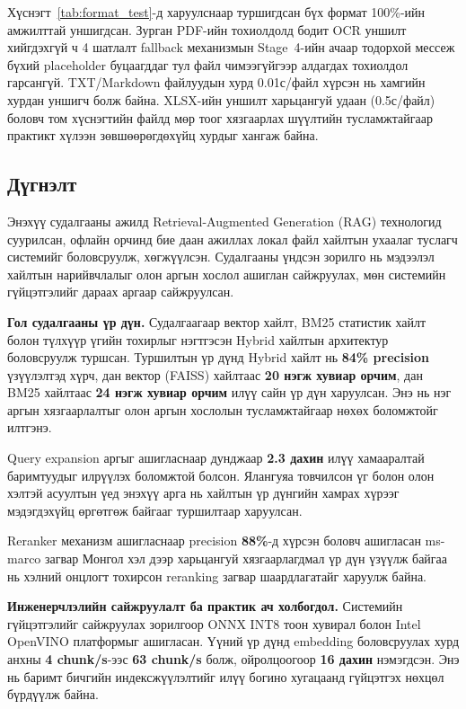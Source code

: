 \documentclass[11pt,a4paper]{article}
\begin{document}
Хүснэгт~\ref{tab:format_test}-д харуулснаар туршигдсан бүх формат 100\%-ийн амжилттай уншигдсан. Зурган PDF-ийн тохиолдолд бодит OCR уншилт хийгдэхгүй ч 4 шатлалт fallback механизмын Stage~4-ийн ачаар тодорхой мессеж бүхий placeholder буцаагддаг тул файл чимээгүйгээр алдагдах тохиолдол гарсангүй. TXT/Markdown файлуудын хурд 0.01с/файл хүрсэн нь хамгийн хурдан уншигч болж байна. XLSX-ийн уншилт харьцангуй удаан (0.5с/файл) боловч том хүснэгтийн файлд мөр тоог хязгаарлах шүүлтийн тусламжтайгаар практикт хүлээн зөвшөөрөгдөхүйц хурдыг хангаж байна.

\subsection{Дүгнэлт}

Энэхүү судалгааны ажилд Retrieval-Augmented Generation (RAG) технологид суурилсан, офлайн орчинд бие даан ажиллах локал файл хайлтын ухаалаг туслагч системийг боловсруулж, хөгжүүлсэн. Судалгааны үндсэн зорилго нь мэдээлэл хайлтын нарийвчлалыг олон аргын хослол ашиглан сайжруулах, мөн системийн гүйцэтгэлийг дараах аргаар сайжруулсан. 

\textbf{Гол судалгааны үр дүн.}
Судалгаагаар вектор хайлт, BM25 статистик хайлт болон түлхүүр үгийн тохирлыг нэгтгэсэн Hybrid хайлтын архитектур боловсруулж туршсан. Туршилтын үр дүнд Hybrid хайлт нь \textbf{84\% precision} үзүүлэлтэд хүрч, дан вектор (FAISS) хайлтаас \textbf{20 нэгж хувиар орчим}, дан BM25 хайлтаас \textbf{24 нэгж хувиар орчим} илүү сайн үр дүн харуулсан. Энэ нь нэг аргын хязгаарлалтыг олон аргын хослолын тусламжтайгаар нөхөх боломжтойг илтгэнэ.

Query expansion аргыг ашигласнаар дунджаар \textbf{2.3 дахин} илүү хамааралтай баримтуудыг илрүүлэх боломжтой болсон. Ялангуяа товчилсон үг болон олон хэлтэй асуултын үед энэхүү арга нь хайлтын үр дүнгийн хамрах хүрээг мэдэгдэхүйц өргөтгөж байгааг туршилтаар харуулсан.

Reranker механизм ашигласнаар precision \textbf{88\%}-д хүрсэн боловч ашигласан ms-marco загвар Монгол хэл дээр харьцангуй хязгаарлагдмал үр дүн үзүүлж байгаа нь хэлний онцлогт тохирсон reranking загвар шаардлагатайг харуулж байна.

\textbf{Инженерчлэлийн сайжруулалт ба практик ач холбогдол.}
Системийн гүйцэтгэлийг сайжруулах зорилгоор ONNX INT8 тоон хувирал болон Intel OpenVINO платформыг ашигласан. Үүний үр дүнд embedding боловсруулах хурд анхны \textbf{4 chunk/s}-ээс \textbf{63 chunk/s} болж, ойролцоогоор \textbf{16 дахин} нэмэгдсэн. Энэ нь баримт бичгийн индексжүүлэлтийг илүү богино хугацаанд гүйцэтгэх нөхцөл бүрдүүлж байна.
\end{document}
